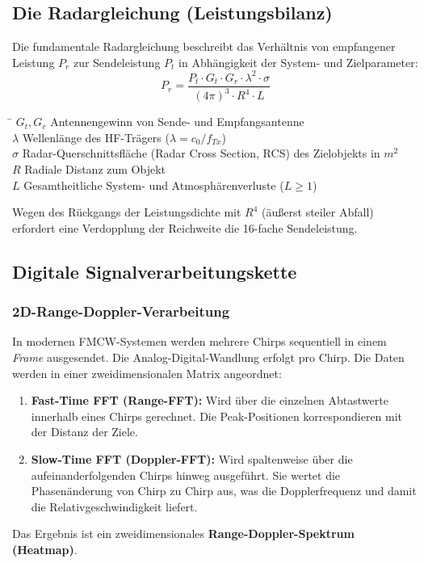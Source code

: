\documentclass[8pt,a4paper]{article}
\begin{document}
\subsection{Die Radargleichung (Leistungsbilanz)}
Die fundamentale Radargleichung beschreibt das Verhältnis von empfangener Leistung $P_r$ zur Sendeleistung $P_t$ in Abhängigkeit der System- und Zielparameter:
\begin{equation}
    P_r = \frac{P_t \cdot G_t \cdot G_r \cdot \lambda^2 \cdot \sigma}{(4\pi)^3 \cdot R^4 \cdot L}
\end{equation}
\begin{tabbing}
    \hspace*{2cm} \= \hspace*{10cm} \kill
    $G_t, G_r$ \> Antennengewinn von Sende- und Empfangsantenne \\
    $\lambda$ \> Wellenlänge des HF-Trägers ($\lambda = c_0 / f_{Tx}$) \\
    $\sigma$ \> Radar-Querschnittsfläche (Radar Cross Section, RCS) des Zielobjekts in $m^2$ \\
    $R$ \> Radiale Distanz zum Objekt \\
    $L$ \> Gesamtheitliche System- und Atmosphärenverluste ($L \ge 1$)
\end{tabbing}
Wegen des Rückgangs der Leistungsdichte mit $R^4$ (äußerst steiler Abfall) erfordert eine Verdopplung der Reichweite die 16-fache Sendeleistung.

\subsection{Digitale Signalverarbeitungskette}

\subsubsection{2D-Range-Doppler-Verarbeitung}
In modernen FMCW-Systemen werden mehrere Chirps sequentiell in einem \textit{Frame} ausgesendet. Die Analog-Digital-Wandlung erfolgt pro Chirp. Die Daten werden in einer zweidimensionalen Matrix angeordnet:
\begin{enumerate}
    \item \textbf{Fast-Time FFT (Range-FFT):} Wird über die einzelnen Abtastwerte innerhalb eines Chirps gerechnet. Die Peak-Positionen korrespondieren mit der Distanz der Ziele.
    \item \textbf{Slow-Time FFT (Doppler-FFT):} Wird spaltenweise über die aufeinanderfolgenden Chirps hinweg ausgeführt. Sie wertet die Phasenänderung von Chirp zu Chirp aus, was die Dopplerfrequenz und damit die Relativgeschwindigkeit liefert.
\end{enumerate}
Das Ergebnis ist ein zweidimensionales \textbf{Range-Doppler-Spektrum (Heatmap)}.
\end{document}
